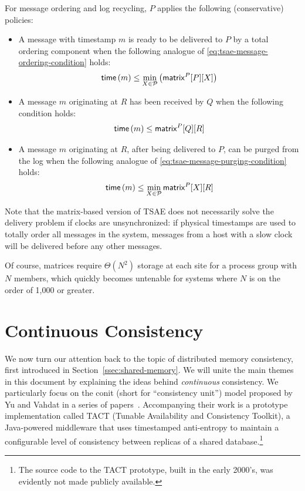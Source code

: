 \documentclass[]             %
{NASA}                       %
\theoremstyle{definition}
\begin{document}
For message ordering and log recycling, $P$ applies the following
(conservative) policies:
\begin{itemize}
\item A message with timestamp $m$ is ready to be delivered to $P$ by a total
  ordering component when the following analogue of \eqref{eq:tsae-message-ordering-condition} holds:
  \begin{equation}
    \mathsf{time}\left(m\right) \leq \min_{X \in \mathcal{P}} \left(\mathsf{matrix}^{P}[P][X]\right)
  \end{equation}
\item A message $m$ originating at $R$ has been
  received by $Q$ when the following condition holds:
  \begin{equation}
    \mathsf{time}\left(m\right) \leq \mathsf{matrix}^{P}[Q][R]
  \end{equation}
\item A message $m$ originating at $R$, after being delivered to $P$,
  can be purged from the log when the following analogue of
  \eqref{eq:tsae-message-purging-condition} holds:
  \begin{equation}
    \mathsf{time}\left(m\right) \leq \min_{X \in \mathcal{P}}\mathsf{matrix}^{P}[X][R]
  \end{equation}
\end{itemize}
Note that the matrix-based version of TSAE does not necessarily solve
the delivery problem if clocks are unsynchronized: if physical
timestamps are used to totally order all messages in the system,
messages from a host with a slow clock will be delivered before any
other messages.

Of course, matrices require $\Theta(N^2)$ storage at each site for a
process group with $N$ members, which quickly becomes untenable for
systems where $N$ is on the order of 1,000 or greater.

\section{Continuous Consistency}
\label{sec:continuous-consistency}
We now turn our attention back to the topic of distributed memory
consistency, first introduced in Section~\ref{ssec:shared-memory}. We
will unite the main themes in this document by explaining the ideas
behind \emph{continuous} consistency. We particularly focus on the
conit (short for ``consistency unit'') model proposed by Yu and Vahdat
in a series of papers~\cite{2000tact,2000tactalgorithms,10.5555/1251229.1251250,DBLP:conf/icdcs/YuV01,2002tact}.
Accompanying their work is a prototype implementation called TACT
(Tunable Availability and Consistency Toolkit), a Java-powered
middleware that uses timestamped anti-entropy to maintain a
configurable level of consistency between replicas of a shared
database.\footnote{The source code to the TACT prototype, built in the
  early 2000's, was evidently not made publicly available.}
\end{document}
